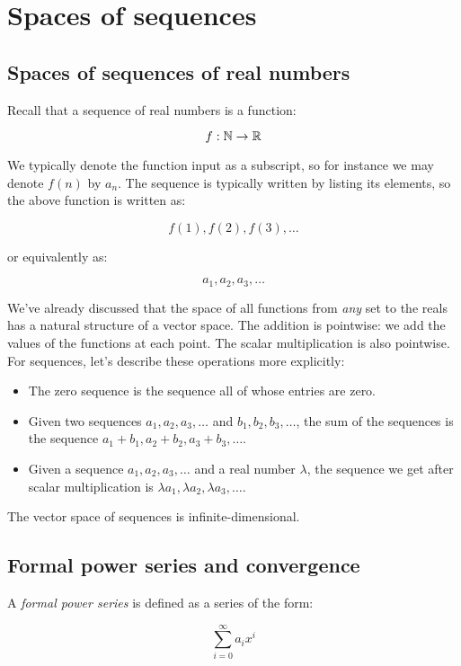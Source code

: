 \documentclass[10pt]{amsart}
\begin{document}
\section{Spaces of sequences}

\subsection{Spaces of sequences of real numbers}

Recall that a sequence of real numbers is a function:

$$f: \mathbb{N} \to \mathbb{R}$$

We typically denote the function input as a subscript, so for instance
we may denote $f(n)$ by $a_n$. The sequence is typically written by
listing its elements, so the above function is written as:

$$f(1),f(2),f(3),\dots$$

or equivalently as:

$$a_1,a_2,a_3,\dots$$

We've already discussed that the space of all functions from {\em any}
set to the reals has a natural structure of a vector space. The
addition is pointwise: we add the values of the functions at each
point. The scalar multiplication is also pointwise. For sequences,
let's describe these operations more explicitly:

\begin{itemize}
\item The zero sequence is the sequence all of whose entries are zero.
\item Given two sequences $a_1,a_2,a_3,\dots$ and $b_1,b_2,b_3,\dots$,
  the sum of the sequences is the sequence $a_1 + b_1, a_2 + b_2, a_3
  + b_3, \dots$.
\item Given a sequence $a_1,a_2,a_3,\dots$ and a real number
  $\lambda$, the sequence we get after scalar multiplication is
  $\lambda a_1, \lambda a_2, \lambda a_3, \dots$.
\end{itemize}

The vector space of sequences is infinite-dimensional.

\subsection{Formal power series and convergence}

A {\em formal power series} is defined as a series of the form:

$$\sum_{i=0}^\infty a_ix^i$$
\end{document}
